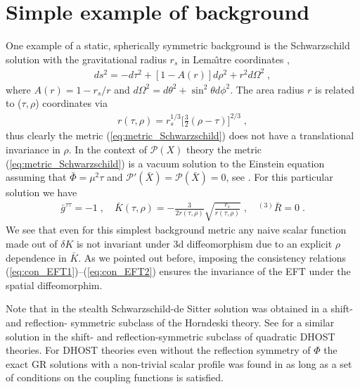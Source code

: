 \documentclass[a4paper,11pt]{article}
\numberwithin{equation}{section}
\begin{document}

\appendix

\section{Simple example of background}
\label{app:simple_background}


One example of a static, spherically symmetric background is the Schwarzschild solution with the gravitational radius $r_s$ in Lema\^{\i}tre coordinates \cite{Lemaitre:1933gd},
\begin{align}\label{eq:metric_Schwarzschild}
ds^2 = -d\tau^2 + [1 - A(r)] d\rho^2+ r^2 d\Omega^2 \;,
\end{align}
where $A(r) = 1 - r_s/r$ and $d\Omega^2 = d\theta^2 + \sin^2\theta d\phi^2$. The area radius $r$ is related to ($\tau,\rho$) coordinates via
\begin{align}
r(\tau,\rho) = r_s^{1/3} \bigg[\frac{3}{2}(\rho - \tau) \bigg]^{2/3} \;,
\end{align}
thus clearly the metric (\ref{eq:metric_Schwarzschild}) does not have a translational invariance in $\rho$. In the context of $\mathcal{P}(X)$ theory the metric (\ref{eq:metric_Schwarzschild}) is a vacuum solution to the Einstein equation assuming that $\bar{\Phi} = \mu^2 \tau$ and $\mathcal{P}'(\bar{X}) = \mathcal{P}(\bar{X}) = 0$, see \cite{Mukohyama:2005rw}. For this particular solution we have 
\begin{align}\label{eq:metric_Schwarzschild_gtautauKR}
\bar{g}^{\tau\tau} = -1 \;, \quad \bar{K}(\tau,\rho) = -\frac{3}{2 r(\tau,\rho)} \sqrt{\frac{r_s}{r(\tau,\rho)}}  \;,  \quad {}^{(3)}\!\bar{R} = 0 \;.
\end{align}
We see that even for this simplest background metric any naive scalar function made out of $\delta K$ is not invariant under 3d diffeomorphism due to an explicit $\rho$ dependence in $\bar{K}$. As we pointed out before, imposing the consistency relations (\ref{eq:con_EFT1})--(\ref{eq:con_EFT2}) ensures the invariance of the EFT under the spatial diffeomorphim. 

Note that in \cite{Kobayashi:2014eva} the stealth Schwarzschild-de Sitter solution was obtained in a shift- and reflection- symmetric subclass of the Horndeski theory. See \cite{Takahashi:2019oxz} for a similar solution in the shift- and reflection-symmetric subclass of quadratic DHOST theories.  For DHOST theories even without the reflection symmetry of $\Phi$ the exact GR solutions with a non-trivial scalar profile was found in \cite{Takahashi:2020hso} as long as a set of conditions on the coupling functions is satisfied.
\end{document}
